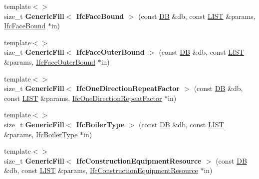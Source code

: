 \begin{DoxyCompactItemize}
\item 
\hypertarget{namespace_assimp_1_1_s_t_e_p_a097ff6de3ad65cecc761f7ee155f3895}{{\footnotesize template$<$$>$ }\\size\+\_\+t {\bfseries Generic\+Fill$<$ Ifc\+Face\+Bound $>$} (const \hyperlink{class_assimp_1_1_s_t_e_p_1_1_d_b}{D\+B} \&db, const \hyperlink{class_assimp_1_1_s_t_e_p_1_1_e_x_p_r_e_s_s_1_1_l_i_s_t}{L\+I\+S\+T} \&params, \hyperlink{struct_assimp_1_1_i_f_c_1_1_ifc_face_bound}{Ifc\+Face\+Bound} $\ast$in)}\label{namespace_assimp_1_1_s_t_e_p_a097ff6de3ad65cecc761f7ee155f3895}

\item 
\hypertarget{namespace_assimp_1_1_s_t_e_p_a2dfe4832770b6093ed26ea091fe331e6}{{\footnotesize template$<$$>$ }\\size\+\_\+t {\bfseries Generic\+Fill$<$ Ifc\+Face\+Outer\+Bound $>$} (const \hyperlink{class_assimp_1_1_s_t_e_p_1_1_d_b}{D\+B} \&db, const \hyperlink{class_assimp_1_1_s_t_e_p_1_1_e_x_p_r_e_s_s_1_1_l_i_s_t}{L\+I\+S\+T} \&params, \hyperlink{struct_assimp_1_1_i_f_c_1_1_ifc_face_outer_bound}{Ifc\+Face\+Outer\+Bound} $\ast$in)}\label{namespace_assimp_1_1_s_t_e_p_a2dfe4832770b6093ed26ea091fe331e6}

\item 
\hypertarget{namespace_assimp_1_1_s_t_e_p_a3f08deba1dd418e24a8476eb358f8c21}{{\footnotesize template$<$$>$ }\\size\+\_\+t {\bfseries Generic\+Fill$<$ Ifc\+One\+Direction\+Repeat\+Factor $>$} (const \hyperlink{class_assimp_1_1_s_t_e_p_1_1_d_b}{D\+B} \&db, const \hyperlink{class_assimp_1_1_s_t_e_p_1_1_e_x_p_r_e_s_s_1_1_l_i_s_t}{L\+I\+S\+T} \&params, \hyperlink{struct_assimp_1_1_i_f_c_1_1_ifc_one_direction_repeat_factor}{Ifc\+One\+Direction\+Repeat\+Factor} $\ast$in)}\label{namespace_assimp_1_1_s_t_e_p_a3f08deba1dd418e24a8476eb358f8c21}

\item 
\hypertarget{namespace_assimp_1_1_s_t_e_p_a5ae011fadf7082b568061829b37d11a3}{{\footnotesize template$<$$>$ }\\size\+\_\+t {\bfseries Generic\+Fill$<$ Ifc\+Boiler\+Type $>$} (const \hyperlink{class_assimp_1_1_s_t_e_p_1_1_d_b}{D\+B} \&db, const \hyperlink{class_assimp_1_1_s_t_e_p_1_1_e_x_p_r_e_s_s_1_1_l_i_s_t}{L\+I\+S\+T} \&params, \hyperlink{struct_assimp_1_1_i_f_c_1_1_ifc_boiler_type}{Ifc\+Boiler\+Type} $\ast$in)}\label{namespace_assimp_1_1_s_t_e_p_a5ae011fadf7082b568061829b37d11a3}

\item 
\hypertarget{namespace_assimp_1_1_s_t_e_p_a06e3210d79df481c58d5be5d1c65b011}{{\footnotesize template$<$$>$ }\\size\+\_\+t {\bfseries Generic\+Fill$<$ Ifc\+Construction\+Equipment\+Resource $>$} (const \hyperlink{class_assimp_1_1_s_t_e_p_1_1_d_b}{D\+B} \&db, const \hyperlink{class_assimp_1_1_s_t_e_p_1_1_e_x_p_r_e_s_s_1_1_l_i_s_t}{L\+I\+S\+T} \&params, \hyperlink{struct_assimp_1_1_i_f_c_1_1_ifc_construction_equipment_resource}{Ifc\+Construction\+Equipment\+Resource} $\ast$in)}\label{namespace_assimp_1_1_s_t_e_p_a06e3210d79df481c58d5be5d1c65b011}


\end{DoxyCompactItemize}
